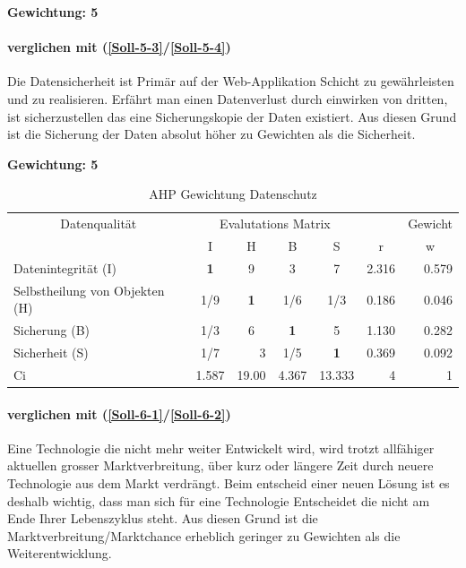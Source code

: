 \textbf{Gewichtung: 5}

\paragraph*{ verglichen mit  (\ref{Soll-5-3}/\ref{Soll-5-4})}
Die Datensicherheit ist Primär auf der Web-Applikation Schicht zu gewährleisten und zu realisieren. Erfährt man einen Datenverlust durch einwirken von dritten, ist sicherzustellen das eine Sicherungskopie der Daten existiert. Aus diesen Grund ist die Sicherung der Daten absolut höher zu Gewichten als die Sicherheit.  

\textbf{Gewichtung: 5}

\begin{table}[htbp]
\caption{AHP Gewichtung Datenschutz}
\begin{tabular}{|l|c|c|c|c|r|r|}
\hline
\multicolumn{ 1}{|c|}{Datenqualität} & \multicolumn{ 4}{c|}{Evalutations Matrix} & \multicolumn{1}{l|}{} & \multicolumn{1}{l|}{Gewicht} \\ \cline{ 2- 7}
\multicolumn{ 1}{|c|}{} & I & H & B & S & \multicolumn{1}{c|}{r} & \multicolumn{1}{c|}{w} \\ \hline
Datenintegrität (I) & \textbf{1} & 9 & 3 & 7 & 2.316 & 0.579 \\ \hline
Selbstheilung von Objekten (H) &  1/9 & \textbf{1} &  1/6 &  1/3 & 0.186 & 0.046 \\ \hline
Sicherung (B) &  1/3 & 6 & \textbf{1} & 5 & 1.130 & 0.282 \\ \hline
Sicherheit (S) &  1/7 & \multicolumn{1}{r|}{3    } &  1/5 & \textbf{1} & 0.369 & 0.092 \\ \hline  \hline
Ci & \multicolumn{1}{r|}{1.587} & \multicolumn{1}{r|}{19.00} & \multicolumn{1}{r|}{4.367} & \multicolumn{1}{r|}{13.333} & 4 & 1 \\ \hline
\end{tabular}
\label{AHPDatenqualität}
\end{table}

\paragraph*{ verglichen mit  (\ref{Soll-6-1}/\ref{Soll-6-2})}Eine Technologie die nicht mehr weiter Entwickelt wird, wird trotzt allfähiger aktuellen grosser Marktverbreitung, über kurz oder längere Zeit durch neuere Technologie aus dem Markt verdrängt. Beim entscheid einer neuen Lösung ist es deshalb wichtig, dass man sich für eine Technologie Entscheidet die nicht am Ende Ihrer Lebenszyklus steht. Aus diesen Grund ist die Marktverbreitung/Marktchance erheblich geringer zu Gewichten als die Weiterentwicklung.

